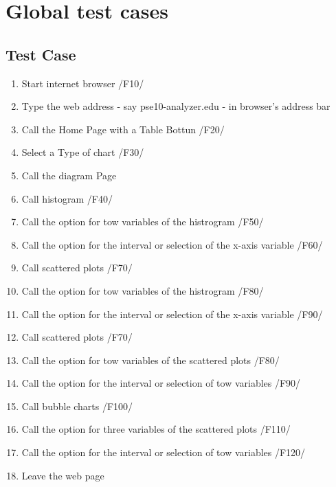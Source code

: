 \section{Global test cases}

\renewcommand{\theenumi}{/T\arabic{enumi}0/}
\renewcommand{\labelenumi}{\theenumi}

\subsection{Test Case}

\begin{enumerate}


\item Start internet browser /F10/

\item Type the web address - say pse10-analyzer.edu - in browser's address bar

\item Call the Home Page with a Table Bottun /F20/ %

\item Select a Type of chart /F30/

\item Call the diagram Page 

\item Call histogram /F40/

\item Call the option for tow variables of the histrogram /F50/

\item Call the option for the interval or selection of the x-axis variable /F60/

\item Call  scattered plots  /F70/

\item Call the option for tow variables of the histrogram /F80/

\item Call the option for the interval or selection of the x-axis variable /F90/

\item Call  scattered plots  /F70/

\item Call the option for tow variables of the scattered plots /F80/

\item Call the option for the interval or selection of tow variables /F90/

\item Call bubble charts /F100/

\item Call the option for three variables of the scattered plots /F110/

\item Call the option for the interval or selection of tow variables /F120/

\item Leave the web page

\end{enumerate}
